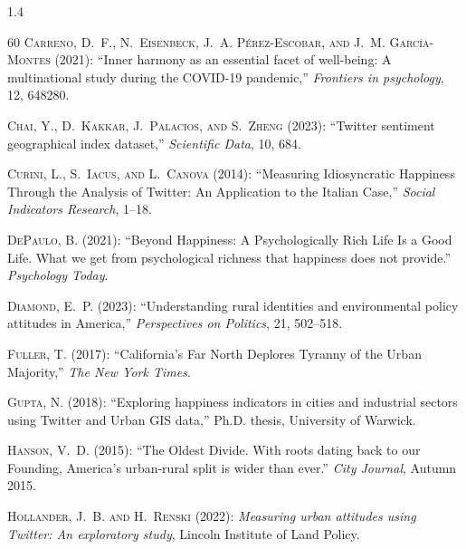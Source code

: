 \documentclass[10pt, letterpaper]{article}
\begin{document}
\begin{spacing}{1.4}
\begin{thebibliography}{60}
\textsc{Carreno, D.~F., N.~Eisenbeck, J.~A. P{\'e}rez-Escobar, and J.~M.
  Garc{\'\i}a-Montes} (2021): \enquote{Inner harmony as an essential facet of
  well-being: A multinational study during the COVID-19 pandemic,}
  \emph{Frontiers in psychology}, 12, 648280.

\textsc{Chai, Y., D.~Kakkar, J.~Palacios, and S.~Zheng} (2023):
  \enquote{Twitter sentiment geographical index dataset,} \emph{Scientific
  Data}, 10, 684.

\textsc{Curini, L., S.~Iacus, and L.~Canova} (2014): \enquote{Measuring
  Idiosyncratic Happiness Through the Analysis of Twitter: An Application to
  the Italian Case,} \emph{Social Indicators Research}, 1--18.

\textsc{DePaulo, B.} (2021): \enquote{Beyond Happiness: A Psychologically Rich
  Life Is a Good Life. What we get from psychological richness that happiness
  does not provide.} \emph{Psychology Today}.

\textsc{Diamond, E.~P.} (2023): \enquote{Understanding rural identities and
  environmental policy attitudes in America,} \emph{Perspectives on Politics},
  21, 502--518.

\textsc{Fuller, T.} (2017): \enquote{California's Far North Deplores Tyranny of
  the Urban Majority,} \emph{The New York Times}.

\textsc{Gupta, N.} (2018): \enquote{Exploring happiness indicators in cities
  and industrial sectors using Twitter and Urban GIS data,} Ph.D. thesis,
  University of Warwick.

\textsc{Hanson, V.~D.} (2015): \enquote{The Oldest Divide. With roots dating
  back to our Founding, America's urban-rural split is wider than ever.}
  \emph{City Journal}, Autumn 2015.

\textsc{Hollander, J.~B. and H.~Renski} (2022): \emph{Measuring urban attitudes
  using Twitter: An exploratory study}, Lincoln Institute of Land Policy.


\end{thebibliography}
\end{spacing}
\end{document}
